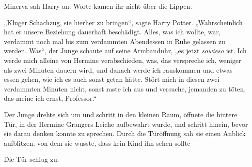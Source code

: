 
Minerva sah Harry an. Worte kamen ihr nicht über die Lippen.

„Kluger Schachzug, sie hierher zu bringen“, sagte Harry Potter. „Wahrscheinlich hat er unsere Beziehung dauerhaft beschädigt. Alles, was ich wollte, war, verdammt noch mal bis zum verdammten Abendessen in Ruhe gelassen zu werden. Was“, der Junge schaute auf seine Armbanduhr, „es jetzt \emph{sowieso} ist. Ich werde mich alleine von Hermine verabschieden, was, das verspreche ich, weniger als zwei Minuten dauern wird, und danach werde ich rauskommen und etwas essen gehen, wie ich es auch sonst getan hätte. Stört mich in diesen zwei verdammten Minuten nicht, sonst raste ich aus und versuche, jemanden zu töten, das meine ich ernst, Professor.“

Der Junge drehte sich um und schritt in den kleinen Raum, öffnete die hintere Tür, in der Hermine Grangers Leiche aufbewahrt wurde, und schritt hinein, bevor sie daran denken konnte zu sprechen. Durch die Türöffnung sah sie einen Anblick aufblitzen, von dem sie wusste, dass kein Kind ihn sehen sollte—

Die Tür schlug zu.



